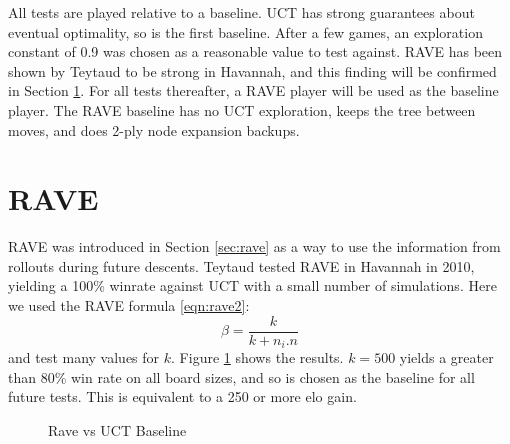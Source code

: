 All tests are played relative to a baseline. UCT has strong guarantees about eventual optimality, so is the first baseline. After a few games, an exploration constant of 0.9 was chosen as a reasonable value to test against. RAVE has been shown by Teytaud to be strong in Havannah\cite{teytaud2010creating}, and this finding will be confirmed in Section \ref{sec:playingrave}. For all tests thereafter, a RAVE player will be used as the baseline player. The RAVE baseline has no UCT exploration, keeps the tree between moves, and does 2-ply node expansion backups.


\section{RAVE}\label{sec:playingrave}

RAVE was introduced in Section \ref{sec:rave} as a way to use the information from rollouts during future descents. Teytaud tested RAVE in Havannah in 2010\cite{teytaud2010creating}, yielding a 100\% winrate against UCT with a small number of simulations. Here we used the RAVE formula \eqref{eqn:rave2}: $$ \beta = \frac{k}{k+n_i.n}$$ and test many values for $k$. Figure \ref{fig:ravegraph} shows the results. $k=500$ yields a greater than 80\% win rate on all board sizes, and so is chosen as the baseline for all future tests. This is equivalent to a 250 or more elo gain.


\begin{figure}
	\centering
{}
	\caption{Rave vs UCT Baseline}
	\label{fig:ravegraph}
\end{figure}

